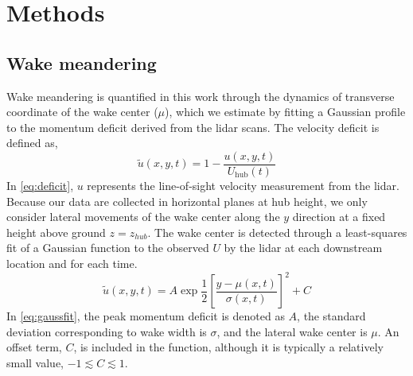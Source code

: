 \documentclass[%
 aip,
 amsmath,
 amssymb,
preprint,%
]{revtex4-2}
\begin{document}
\section{Methods}
\label{sec:methods}

\subsection{Wake meandering}
\label{sec:meander}

Wake meandering is quantified in this work through the dynamics of transverse coordinate of the wake center ($\mu$), which we estimate by fitting a Gaussian profile to the momentum deficit derived from the lidar scans. 
The velocity deficit is defined as,
\begin{equation}
    \tilde{u}(x,y,t) = 1 - \frac{u(x,y,t)}{U_\text{hub}(t)}
    \label{eq:deficit}
\end{equation}
In \cref{eq:deficit}, $u$ represents the line-of-sight velocity measurement from the lidar. 
Because our data are collected in horizontal planes at hub height, we only consider lateral movements of the wake center along the $y$ direction at a fixed height above ground $z=z_{hub}$.
The wake center is detected through a least-squares fit of a Gaussian function to the observed $U$ by the lidar at each downstream location and for each time.
\begin{equation}
  \tilde{u}(x,y,t) = A \exp{\frac{1}{2}\left[ \frac{y-\mu(x,t)}{\sigma(x,t)}\right]^2} + C
  \label{eq:gaussfit}
\end{equation}
In \cref{eq:gaussfit}, the peak momentum deficit is denoted as $A$, the standard deviation corresponding to wake width is $\sigma$, and the lateral wake center is $\mu$.
An offset term, $C$, is included in the function, although it is typically a relatively small value, $-1 \lesssim C \lesssim 1$. 


\end{document}
